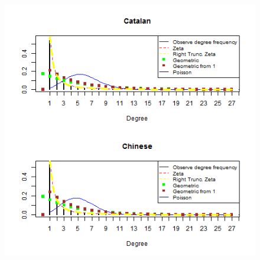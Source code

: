 \documentclass[paper=a4, fontsize=11pt]{scrartcl} %
\theoremstyle{plain}
\begin{document}
\begin{figure}[htbp] %
   \centering
   \includegraphics[width=15cm,height=27cm]{General_2} %

\end{figure}
\end{document}
